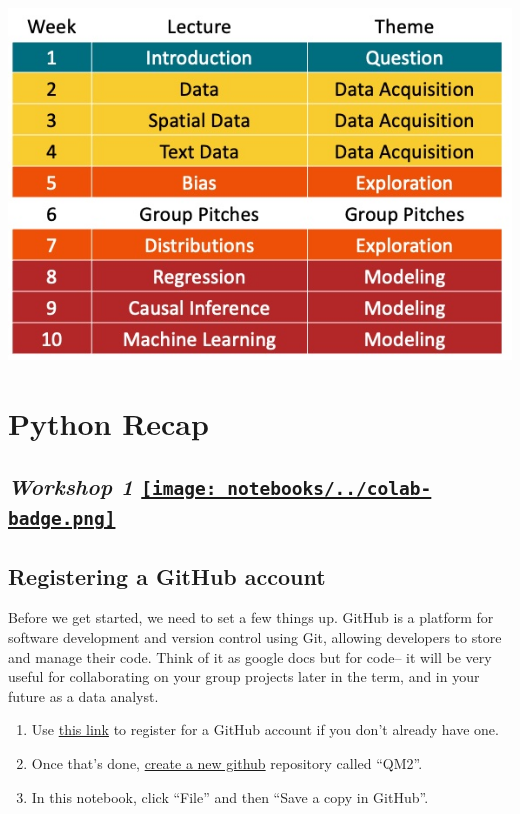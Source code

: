 \documentclass[
  letterpaper,
  DIV=11,
  numbers=noendperiod]{scrreprt}
\providecommand{\tightlist}{%
  \setlength{\itemsep}{0pt}\setlength{\parskip}{0pt}}\usepackage{longtable,booktabs,array}
\begin{document}
\includegraphics{outline.png}


\hypertarget{python-recap}{%
\chapter{Python Recap}\label{python-recap}}

\hypertarget{workshop-1-open-in-colab}{%
\section[\emph{Workshop 1} ]{\texorpdfstring{\emph{Workshop 1}
\href{https://colab.research.google.com/github/oballinger/QM2/blob/main/notebooks/W01.\%20Python\%20Recap.ipynb}{\protect\texttt{[image: notebooks/../colab-badge.png]}}}{Workshop 1 Open In Colab}}\label{workshop-1-open-in-colab}}

\hypertarget{registering-a-github-account}{%
\section{Registering a GitHub
account}\label{registering-a-github-account}}

Before we get started, we need to set a few things up. GitHub is a
platform for software development and version control using Git,
allowing developers to store and manage their code. Think of it as
google docs but for code-- it will be very useful for collaborating on
your group projects later in the term, and in your future as a data
analyst.

\begin{enumerate}
\def\labelenumi{\arabic{enumi}.}
\tightlist
\item
  Use \href{https://github.com/join}{this link} to register for a GitHub
  account if you don't already have one.
\item
  Once that's done, \href{https://github.com/new}{create a new github}
  repository called ``QM2''.
\item
  In this notebook, click ``File'' and then ``Save a copy in GitHub''.
\end{enumerate}
\end{document}

